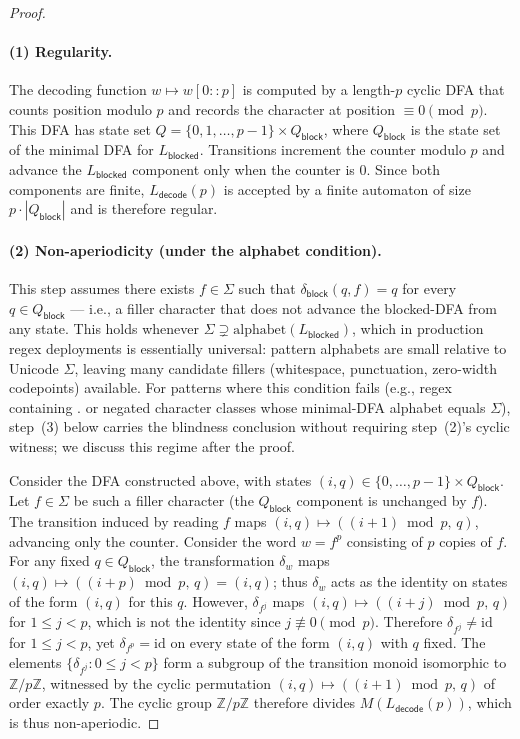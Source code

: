 \documentclass[letterpaper,twocolumn,10pt]{article}
\theoremstyle{definition}
\theoremstyle{remark}
\begin{document}
\begin{proof}\leavevmode
\paragraph{(1) Regularity.}
The decoding function $w \mapsto w[0::p]$ is computed by a length-$p$ cyclic DFA
that counts position modulo $p$ and records the character at position $\equiv 0
\pmod{p}$.
This DFA has state set $Q = \{0, 1, \ldots, p-1\} \times Q_{\mathsf{block}}$,
where $Q_{\mathsf{block}}$ is the state set of the minimal DFA for $L_{\mathsf{blocked}}$.
Transitions increment the counter modulo $p$ and advance the $L_{\mathsf{blocked}}$
component only when the counter is $0$.
Since both components are finite, $L_{\mathsf{decode}}(p)$ is accepted by a finite
automaton of size $p \cdot |Q_{\mathsf{block}}|$ and is therefore regular.

\paragraph{(2) Non-aperiodicity (under the alphabet condition).}
This step assumes there exists $f \in \Sigma$ such that $\delta_{\mathsf{block}}(q, f) = q$
for every $q \in Q_{\mathsf{block}}$ --- i.e., a filler character that does not advance
the blocked-DFA from any state.
This holds whenever $\Sigma \supsetneq \mathrm{alphabet}(L_{\mathsf{blocked}})$, which
in production regex deployments is essentially universal: pattern alphabets are small
relative to Unicode $\Sigma$, leaving many candidate fillers (whitespace, punctuation,
zero-width codepoints) available.
For patterns where this condition fails (e.g., regex containing $.$ or negated character
classes whose minimal-DFA alphabet equals $\Sigma$), step~(3) below carries the blindness
conclusion without requiring step~(2)'s cyclic witness; we discuss this regime after the
proof.

Consider the DFA constructed above, with states $(i, q) \in \{0,\ldots,p{-}1\} \times Q_{\mathsf{block}}$.
Let $f \in \Sigma$ be such a filler character (the $Q_{\mathsf{block}}$ component is
unchanged by $f$).
The transition induced by reading $f$ maps $(i, q) \mapsto ((i+1) \bmod p,\, q)$,
advancing only the counter.
Consider the word $w = f^p$ consisting of $p$ copies of $f$.
For any fixed $q \in Q_{\mathsf{block}}$, the transformation $\delta_w$ maps
$(i, q) \mapsto ((i + p) \bmod p,\, q) = (i, q)$; thus $\delta_w$ acts as the
identity on states of the form $(i, q)$ for this $q$.
However, $\delta_{f^j}$ maps $(i, q) \mapsto ((i+j) \bmod p,\, q)$ for $1 \le j < p$,
which is not the identity since $j \not\equiv 0 \pmod{p}$.
Therefore $\delta_{f^j} \neq \mathrm{id}$ for $1 \le j < p$, yet $\delta_{f^p} = \mathrm{id}$
on every state of the form $(i, q)$ with $q$ fixed.
The elements $\{\delta_{f^j} : 0 \le j < p\}$ form a subgroup of the transition
monoid isomorphic to $\mathbb{Z}/p\mathbb{Z}$, witnessed by the cyclic permutation
$(i, q) \mapsto ((i+1) \bmod p,\, q)$ of order exactly $p$.
The cyclic group $\mathbb{Z}/p\mathbb{Z}$ therefore divides $M(L_{\mathsf{decode}}(p))$,
which is thus non-aperiodic.


\end{proof}
\end{document}
